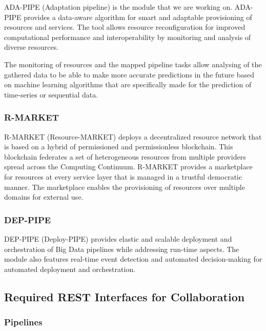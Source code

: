 \documentclass{article}
\begin{document}
                ADA-PIPE (Adaptation pipeline) \cite{mehranADAPIPE2023} is the module that we are working on.
                ADA-PIPE provides a data-aware algorithm for smart and adaptable provisioning of resources and services. The tool allows resource reconfiguration for improved computational performance and interoperability by monitoring and analysis of diverse resources. 
                
                The monitoring of resources and the mapped pipeline tasks allow analysing of the gathered data to be able to make more accurate predictions in the future based on machine learning algorithms that are specifically made for the prediction of time-series or sequential data.

            \subsubsection*{R-MARKET}
            \label{sec:resource-market-datacloud}

                R-MARKET (Resource-MARKET) \cite{senguptaRMARKET} deploys a decentralized resource network that is based on a hybrid of permissioned and permissionless blockchain. This blockchain federates a set of heterogeneous resources from multiple providers spread across the Computing Continuum.
                R-MARKET provides a marketplace for resources at every service layer that is managed in a trustful democratic manner.
                The marketplace enables the provisioning of resources over multiple domains for external use.

            \subsubsection*{DEP-PIPE}
            \label{sec:deploy-pipe-datacloud}

                DEP-PIPE (Deploy-PIPE) \cite{ledakisDEPPIPE} provides elastic and scalable deployment and orchestration of Big Data pipelines while addressing run-time aspects.
                The module also features real-time event detection and automated decision-making for automated deployment and orchestration.

        \subsection{Required REST Interfaces for Collaboration}
        \label{sec:required-interfaces}

            \subsubsection{Pipelines}
            
\end{document}
